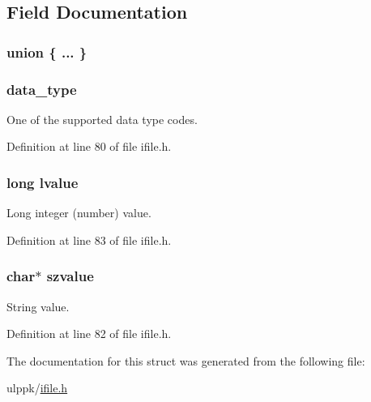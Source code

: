 \subsection{Field Documentation}
\hypertarget{struct_i_f___e_l_e_m_e_n_t___n_o_d_e_aa310c8a2347cba82d24b5eea587ee8d2}{\subsubsection[{"@1}]{\setlength{\rightskip}{0pt plus 5cm}union \{ ... \} }}\label{struct_i_f___e_l_e_m_e_n_t___n_o_d_e_aa310c8a2347cba82d24b5eea587ee8d2}
\hypertarget{struct_i_f___e_l_e_m_e_n_t___n_o_d_e_ae27efc82f81963f04c22dcfcc70c8766}{
\subsubsection[{data\-\_\-type}]{ data\-\_\-type}}\label{struct_i_f___e_l_e_m_e_n_t___n_o_d_e_ae27efc82f81963f04c22dcfcc70c8766}


One of the supported data type codes. 



Definition at line 80 of file ifile.\-h.

\hypertarget{struct_i_f___e_l_e_m_e_n_t___n_o_d_e_ad27f45c6331d8b6ac603e0cae235fb61}{
\subsubsection[{lvalue}]{\setlength{\rightskip}{0pt plus 5cm}long lvalue}}\label{struct_i_f___e_l_e_m_e_n_t___n_o_d_e_ad27f45c6331d8b6ac603e0cae235fb61}


Long integer (number) value. 



Definition at line 83 of file ifile.\-h.

\hypertarget{struct_i_f___e_l_e_m_e_n_t___n_o_d_e_aaaa4cb8698d025a0d88dbf1393392320}{
\subsubsection[{szvalue}]{\setlength{\rightskip}{0pt plus 5cm}char$\ast$ szvalue}}\label{struct_i_f___e_l_e_m_e_n_t___n_o_d_e_aaaa4cb8698d025a0d88dbf1393392320}


String value. 



Definition at line 82 of file ifile.\-h.



The documentation for this struct was generated from the following file\-:\begin{DoxyCompactItemize}
\item 
ulppk/\hyperlink{ifile_8h}{ifile.\-h}\end{DoxyCompactItemize}

